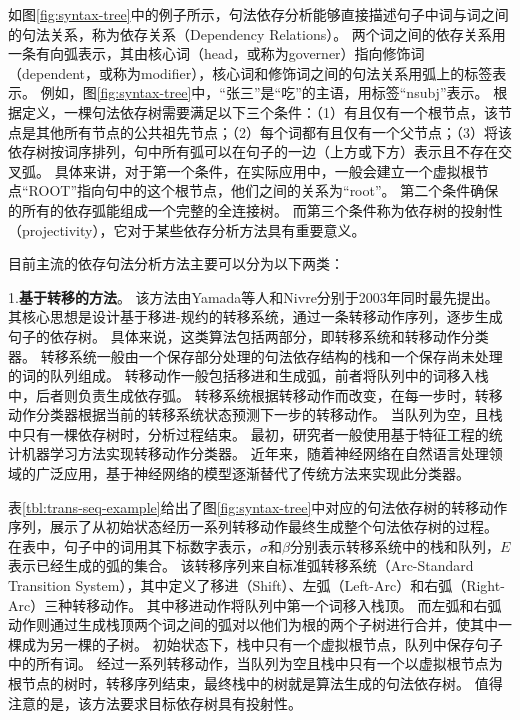 如图\ref{fig:syntax-tree}中的例子所示，句法依存分析能够直接描述句子中词与词之间的句法关系，称为依存关系（Dependency Relations）。
两个词之间的依存关系用一条有向弧表示，其由核心词（head，或称为governer）指向修饰词（dependent，或称为modifier），核心词和修饰词之间的句法关系用弧上的标签表示。
例如，图\ref{fig:syntax-tree}中，“张三”是“吃”的主语，用标签“nsubj”表示。
根据定义，一棵句法依存树需要满足以下三个条件：（1）有且仅有一个根节点，该节点是其他所有节点的公共祖先节点；（2）每个词都有且仅有一个父节点；（3）将该依存树按词序排列，句中所有弧可以在句子的一边（上方或下方）表示且不存在交叉弧。
具体来讲，对于第一个条件，在实际应用中，一般会建立一个虚拟根节点“ROOT”指向句中的这个根节点，他们之间的关系为“root”。
第二个条件确保的所有的依存弧能组成一个完整的全连接树。
而第三个条件称为依存树的投射性（projectivity），它对于某些依存分析方法具有重要意义。

目前主流的依存句法分析方法主要可以分为以下两类：

1.\textbf{基于转移的方法}。
该方法由Yamada等人\cite{yamada-etal-2003-statistical}和Nivre\cite{nivre-2003-efficient}分别于2003年同时最先提出。
其核心思想是设计基于移进-规约的转移系统，通过一条转移动作序列，逐步生成句子的依存树。
具体来说，这类算法包括两部分，即转移系统和转移动作分类器。
转移系统一般由一个保存部分处理的句法依存结构的栈和一个保存尚未处理的词的队列组成。
转移动作一般包括移进和生成弧，前者将队列中的词移入栈中，后者则负责生成依存弧。
转移系统根据转移动作而改变，在每一步时，转移动作分类器根据当前的转移系统状态预测下一步的转移动作。
当队列为空，且栈中只有一棵依存树时，分析过程结束。
最初，研究者一般使用基于特征工程的统计机器学习方法实现转移动作分类器。
近年来，随着神经网络在自然语言处理领域的广泛应用，基于神经网络的模型逐渐替代了传统方法来实现此分类器。

表\ref{tbl:trans-seq-example}给出了图\ref{fig:syntax-tree}中对应的句法依存树的转移动作序列，展示了从初始状态经历一系列转移动作最终生成整个句法依存树的过程。
在表中，句子中的词用其下标数字表示，$\sigma$和$\beta$分别表示转移系统中的栈和队列，$E$表示已经生成的弧的集合。
该转移序列来自标准弧转移系统（Arc-Standard Transition System），其中定义了移进（Shift）、左弧（Left-Arc）和右弧（Right-Arc）三种转移动作。
其中移进动作将队列中第一个词移入栈顶。
而左弧和右弧动作则通过生成栈顶两个词之间的弧对以他们为根的两个子树进行合并，使其中一棵成为另一棵的子树。
初始状态下，栈中只有一个虚拟根节点，队列中保存句子中的所有词。
经过一系列转移动作，当队列为空且栈中只有一个以虚拟根节点为根节点的树时，转移序列结束，最终栈中的树就是算法生成的句法依存树。
值得注意的是，该方法要求目标依存树具有投射性。

